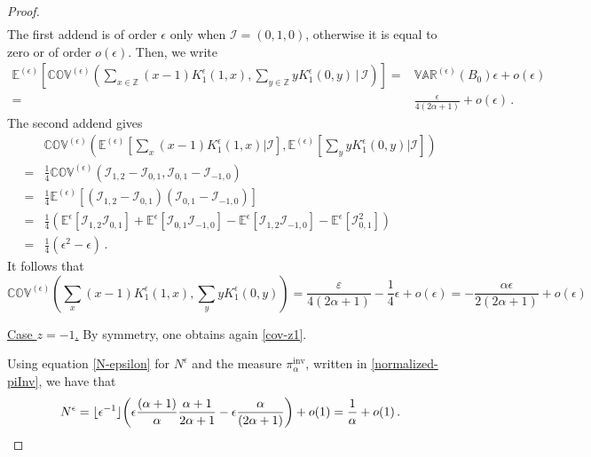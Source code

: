 \documentclass[10pt,a4paper]{amsart}
\newcommand{\eps}{\varepsilon}
\begin{document}
\begin{proof}
\begin{multline*}
\end{multline*}
The first addend is of order $\epsilon$ only when $\bm{\mathcal{I}}=(0,1,0)$, otherwise it is equal to zero or of order $o(\epsilon)$. Then, we write
\begin{equation}
	\begin{split}
		\mathbb{E}^{(\epsilon)}\left[\mathbb{COV}^{(\epsilon)}\left(\sum_{x\in \mathbb{Z}}(x-1)K_{1}^{\epsilon}(1,x),\sum_{y\in \mathbb{Z}}yK_{1}^{\epsilon}(0,y)\,\bigg|\,\bm{\mathcal{I}}\right)\right]=&
		\mathbb{VAR}^{(\epsilon)}(B_{0})\epsilon+o(\epsilon)
		\\=&
		\frac{\epsilon}{4(2\alpha+1)}+o(\epsilon)\,.
	\end{split}
\end{equation}
{\color{black}The second addend gives 
	\begin{equation}
		\begin{split}
			&\mathbb{COV}^{(\epsilon)}\left(\mathbb{E}^{(\epsilon)}\left[\sum_{x}(x-1)K_{1}^{\epsilon}(1,x)\bigg|\mathbf{\mathcal{I}}\right],\mathbb{E}^{(\epsilon)}\left[\sum_{y}yK_{1}^{\epsilon}(0,y)\bigg|\mathbf{\mathcal{I}}\right]\right) 
			\\=& \frac{1}{4}\mathbb{COV}^{(\epsilon)}\left(\mathcal{I}_{1,2}-\mathcal{I}_{0,1},\mathcal{I}_{0,1}-\mathcal{I}_{-1,0}\right)
			\\=&
			\frac{1}{4}\mathbb{E}^{(\epsilon)}\left[(\mathcal{I}_{1,2}-\mathcal{I}_{0,1})(\mathcal{I}_{0,1}-\mathcal{I}_{-1,0})\right]
			\\=& 
			\frac{1}{4}\left(\mathbb{E}^{\epsilon}[\mathcal{I}_{1,2}\mathcal{I}_{0,1}]+\mathbb{E}^{\epsilon}[\mathcal{I}_{0,1}\mathcal{I}_{-1,0}]-\mathbb{E}^{\epsilon}[\mathcal{I}_{1,2}\mathcal{I}_{-1,0}]-\mathbb{E}^{\epsilon}[\mathcal{I}_{0,1}^{2}]\right)
			\\=&
			\frac{1}{4}(\epsilon^{2}-\epsilon)\,.
		\end{split}
	\end{equation}
	It follows that 
	\begin{equation}\label{cov-z1}
		\mathbb{COV}^{(\epsilon)}\left(\sum_{x}(x-1)K_{1}^{\epsilon}(1,x),\sum_{y}yK_{1}^{\epsilon}(0,y)\right)= \frac{\eps
		}{4(2\alpha+1)}-\frac{1}{4}\epsilon+o(\epsilon)= -\frac{\alpha \epsilon}{2(2\alpha+1)}+o(\epsilon)
	\end{equation}}
\item{\underline{Case $z=-1$.}} By symmetry, one obtains again \eqref{cov-z1}. 

Using equation \eqref{N-epsilon} for $N^{\epsilon}$ and the measure $\pi^{\text{inv}}_{\alpha}$, written in \eqref{normalized-piInv}, we have that 
\begin{equation}\label{numerator-approx-final}
	N^{\epsilon}=\lfloor\epsilon^{-1}\rfloor
{\color{black}	\left(\epsilon \frac{(\alpha+1)}{\alpha}\frac{\alpha+1}{2\alpha+1}-\epsilon\frac{\alpha}{(2\alpha+1)}\right)+o(1)}
	=\frac{1}{\alpha}+o(1)\,.
\end{equation}


\end{proof}
\end{document}
